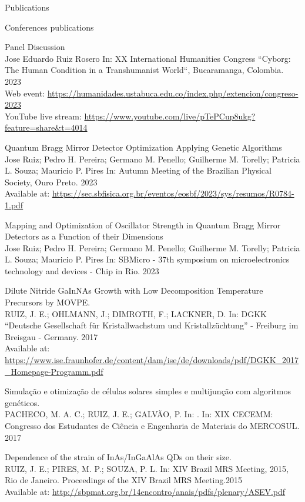 \documentclass{resume} %
\begin{document}
\begin{rSection}{Publications}
\begin{rSubsection}{Conferences publications}{}{}{}
            \item Panel Discussion \\ {\normalfont Jose Eduardo Ruiz Rosero} In: {\normalfont XX International Humanities Congress ``Cyborg: The Human Condition in a Transhumanist World``, Bucaramanga, Colombia. 2023} \\ Web event: {\normalfont \url{https://humanidades.ustabuca.edu.co/index.php/extencion/congreso-2023}} \\ YouTube live stream: {\normalfont \url{https://www.youtube.com/live/pTePCup8ukg?feature=share&t=4014}} %
            \item Quantum Bragg Mirror Detector Optimization Applying Genetic Algorithms \\ {\normalfont Jose Ruiz; Pedro H. Pereira; Germano M. Penello; Guilherme M. Torelly; Patricia L. Souza; Mauricio P. Pires} In:  {\normalfont Autumn Meeting of the Brazilian Physical Society, Ouro Preto. 2023} \\ Available at: {\normalfont  \url{https://sec.sbfisica.org.br/eventos/eosbf/2023/sys/resumos/R0784-1.pdf}} %
            \item Mapping and Optimization of Oscillator Strength in Quantum Bragg Mirror Detectors as a Function of their Dimensions \\ {\normalfont Jose Ruiz; Pedro H. Pereira; Germano M. Penello; Guilherme M. Torelly; Patricia L. Souza; Mauricio P. Pires} In:  {\normalfont SBMicro - 37th symposium on microelectronics technology and devices - Chip in Rio. 2023} %
            \item Dilute Nitride GaInNAs Growth with Low Decomposition Temperature Precursors by MOVPE. \\ {\normalfont RUIZ, J. E.; OHLMANN, J.; DIMROTH, F.; LACKNER, D.} In:  {\normalfont DGKK “Deutsche Gesellschaft für Kristallwachstum und Kristallzüchtung” - Freiburg im Breisgau - Germany. 2017} \\ Available at: {\normalfont  \url{https://www.ise.fraunhofer.de/content/dam/ise/de/downloads/pdf/DGKK_2017_Homepage-Programm.pdf}} %
            \item Simulação e otimização de células solares simples e multijunção com algoritmos genéticos. \\ {\normalfont PACHECO, M. A. C.; RUIZ, J. E.; GALVÃO, P.} In:  {. In: XIX CECEMM: Congresso dos Estudantes de Ciência e Engenharia de Materiais do MERCOSUL. 2017} %
            \item Dependence of the strain of InAs/InGaAlAs QDs on their size. \\ {\normalfont RUIZ, J. E.; PIRES, M. P.; SOUZA, P. L.} In:  {\normalfont XIV Brazil MRS Meeting, 2015, Rio de Janeiro. Proceedings of the XIV Brazil MRS Meeting.2015} \\ Available at: {\normalfont  \url{http://sbpmat.org.br/14encontro/anais/pdfs/plenary/ASEV.pdf}} %

\end{rSubsection}
\end{rSection}
\end{document}
